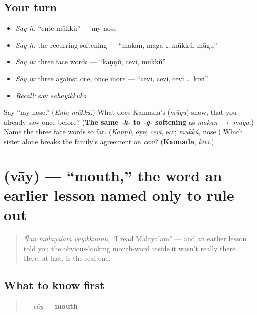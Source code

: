 \subsection*{Your turn}
\begin{itemize}
\raggedright
  \item \emph{Say it:} \textquotedblleft{}ente mūkkŭ\textquotedblright{} — my nose
  \item \emph{Say it:} the recurring softening — \textquotedblleft{}makan, maga … mūkkŭ, mūgu\textquotedblright{}
  \item \emph{Say it:} three face words — \textquotedblleft{}kaṇṇŭ, cevi, mūkkŭ\textquotedblright{}
  \item \emph{Say it:} three against one, once more — \textquotedblleft{}cevi, cevi, cevi … kivi\textquotedblright{}
  \item \emph{Recall:} say \emph{sahāyikkuka}
\end{itemize}

\begin{tcolorbox}[breakable,colback=teal!4,colframe=teal!35!black,title={Before you move on}]
Say \textquotedblleft{}my nose.\textquotedblright{} (\emph{Ente mūkkŭ}.) What does Kannada's \textbf{} (\emph{mūgu}) show, that you already saw once before? (\textbf{The same \emph{-k-} to \emph{-g-} softening} as \emph{makan} $\to$ \emph{maga}.) Name the three face words so far. (\emph{Kaṇṇŭ}, eye; \emph{cevi}, ear; \emph{mūkkŭ}, nose.) Which sister alone breaks the family's agreement on \emph{cevi}? (\textbf{Kannada}, \emph{kivi}.)
\end{tcolorbox}
\section[\texorpdfstring{\ml{വായ്} (vāy)}{വായ് (vāy)}]{ (vāy) — \textquotedblleft{}mouth,\textquotedblright{} the word an earlier lesson named only to rule out}

\label{lesson:ML-C37-vaay}



\begin{quote}
\emph{Ñān malayāḷaṁ vāyikkunnu}, \textquotedblleft{}I read Malayalam\textquotedblright{} — and an earlier lesson told you the obvious-looking mouth-word inside it wasn't really there. Here, at last, is the real one.
\end{quote}

\subsection*{What to know first}
\begin{quote}
\textbf{} — \emph{vāy} — \textbf{mouth}
\end{quote}

